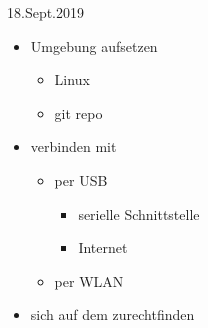 \documentclass{beamer}
\begin{document}
\begin{frame}{18.Sept.2019}
\begin{itemize}
 \item Umgebung aufsetzen
 \begin{itemize}
  \item Linux
  \item git repo
 \end{itemize}
\item \target verbinden mit \host
 \begin{itemize}
  \item per USB
  \begin{itemize}
   \item serielle Schnittstelle 
   \item Internet
  \end{itemize}
  \item per WLAN
 \end{itemize}
\item sich auf dem \target zurechtfinden
\end{itemize}
\end{frame}
\end{document}
